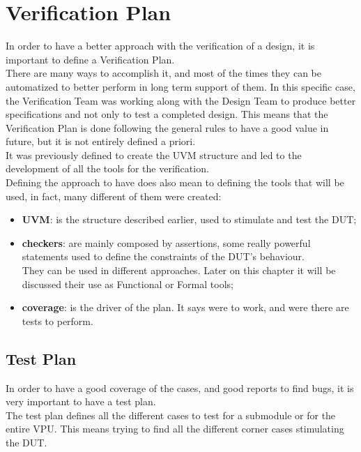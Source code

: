 \section{Verification Plan}
In order to have a better approach with the verification of a design, it is important to define a Verification Plan.\\
There are many ways to accomplish it, and most of the times they can be automatized to better perform in long term support of them. In this specific case, the Verification Team was working along with the Design Team to produce better specifications and not only to test a completed design. This means that the Verification Plan is done following the general rules to have a good value in future, but it is not entirely defined a priori.\\

It was previously defined to create the UVM structure and led to the development of all the tools for the verification. \\
Defining the approach to have does also mean to defining the tools that will be used, in fact, many different of them were created:
\begin{itemize}
    \item \textbf{UVM}: is the structure described earlier, used to stimulate and test the DUT;
    
    \item \textbf{checkers}: are mainly composed by assertions, some really powerful statements used to define the constraints of the DUT's behaviour. \\
    They can be used in different approaches. Later on this chapter it will be discussed their use as Functional or Formal tools;
    
    \item \textbf{coverage}: is the driver of the plan. It says were to work, and were there are tests to perform. 
    
\end{itemize}
\subsection{Test Plan}
In order to have a good coverage of the cases, and good reports to find bugs, it is very important to have a test plan.\\

The test plan defines all the different cases to test for a submodule or for the entire VPU. This means trying to find all the different corner cases stimulating the DUT.\\

